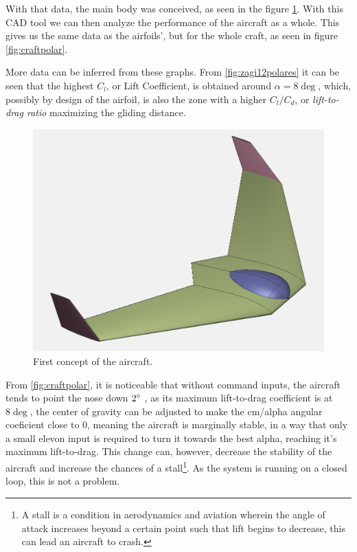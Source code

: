 With that data, the main body was conceived, as seen in the figure \ref{fig:preliminar}. With this CAD tool we can then analyze the performance of the aircraft as a whole. This gives us the same data as the airfoils', but for the whole craft, as seen in figure \ref{fig:craftpolar}.

More data can be inferred from these graphs. From \ref{fig:zagi12polares} it can be seen that the highest $C_l$, or Lift Coefficient, is obtained around $\alpha = 8\deg$, which, possibly by design of the airfoil, is also the zone with a higher $C_l/C_d$, or \textit{lift-to-drag ratio} maximizing the gliding distance. 

\begin{figure}
\centering
  \includegraphics[width=\linewidth]{figs/preliminar.png}
  \caption{First concept of the aircraft.}
  \label{fig:preliminar}
\end{figure}


From \ref{fig:craftpolar}, it is noticeable that without command inputs, the aircraft tends to point the nose down $ 2 \degree $ , as its maximum lift-to-drag coefficient is at $8 \deg$, the center of gravity can be adjusted to make the cm/alpha angular coeficient close to 0, meaning the aircraft is marginally stable, in a way that only a small elevon input is required to turn it towards the best alpha, reaching it's maximum lift-to-drag. This change can, however, decrease the stability of the aircraft and increase the chances of a stall\footnote{A stall is a condition in aerodynamics and aviation wherein the angle of attack increases beyond a certain point such that lift begins to decrease, this can lead an aircraft to crash.}. As the system is running on a closed loop, this is not a problem.

